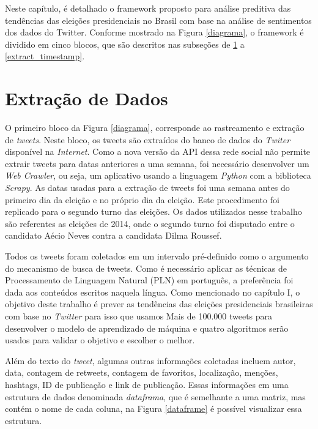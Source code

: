 Neste capítulo, é detalhado o framework proposto para análise
preditiva das tendências das eleições presidenciais no Brasil
com base na análise de sentimentos dos dados do Twitter.
Conforme mostrado na Figura \ref{diagrama}, o framework é dividido em
cinco blocos, que são descritos nas subseções de \ref{extract} a \ref{extract_timestamp}.


%


\section{Extração de Dados}
\label{extract}

O primeiro bloco da Figura \ref{diagrama}, corresponde ao rastreamento
e extração de \textit{tweets}. Neste bloco, os tweets são extraídos do
banco de dados do \textit{Twiter} disponível na \textit{Internet}. Como a nova
versão da \acrshort{API} dessa rede social não permite extrair tweets para datas
anteriores a uma semana, foi necessário desenvolver um \textit{Web
Crawler}, ou seja, um aplicativo usando a linguagem \textit{Python}
com a biblioteca \textit{Scrapy}. As datas usadas para a extração de
tweets foi uma semana antes do primeiro dia da eleição e no
próprio dia da eleição. Este procedimento foi replicado para
o segundo turno das eleições. Os dados utilizados nesse trabalho são referentes as eleições de 2014, onde o segundo turno
foi disputado entre o candidato Aécio Neves contra a candidata Dilma Roussef.


Todos os tweets foram coletados em um intervalo pré-definido
como o argumento do mecanismo de busca de tweets.
Como é necessário aplicar as técnicas de Processamento de
Linguagem Natural (PLN) em português, a preferência foi
dada aos conteúdos escritos naquela língua. Como mencionado
no capítulo I, o objetivo deste trabalho é prever as tendências
das eleições presidenciais brasileiras com base no \textit{Twitter} para
isso que usamos Mais de 100.000 tweets para desenvolver o
modelo de aprendizado de máquina e quatro algoritmos serão
usados para validar o objetivo e escolher o melhor.

Além do texto do \textit{tweet}, algumas outras informações coletadas
incluem autor, data, contagem de retweets, contagem de
favoritos, localização, menções, hashtags, ID de publicação e
link de publicação. Essas informações em uma estrutura de dados denominada \textit{dataframa}, que é semelhante a uma matriz, mas contém o nome de cada 
coluna, na Figura \ref{dataframe} é possível visualizar essa estrutura.

